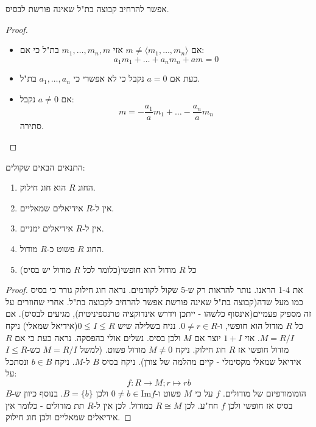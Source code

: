\documentclass{tstextbook}
\begin{document}
\begin{lemma}
אפשר להרחיב קבוצה בת"ל שאינה פורשת לבסיס.

\end{lemma}
\begin{proof}
  \begin{itemize}
    \item אם \(m\neq \langle m_{1},\dots,m_{n} \rangle\) אזי \(m_{1},\dots,m_{n},m\) בת"ל כי אם:
$$a_{1}m_{1}+\dots+a_{n}m_{n}+am=0$$
    \item כעת אם \(a=0\) נקבל כי לא אפשרי כי \(a_{1},\dots,a_{n}\) בת"ל.
    \item אם \(a\neq 0\) נקבל:
$$m=-\frac{a_{1}}{a}m_{1}+\dots-\frac{a_{n}}{a}m_{n}$$
סתירה.
  \end{itemize}
\end{proof}
\begin{proposition}
התנאים הבאים שקולים:

  \begin{enumerate}
    \item החוג \(R\) הוא חוג חילוק. 


    \item אין ל-\(R\) אידיאלים שמאליים. 


    \item אין ל-\(R\) אידיאלים ימניים. 


    \item החוג \(R\) פשוט כ-\(R\) מודול. 


    \item כל \(R\) מודול הוא חופשי(כלומר לכל \(R\) מודול יש בסיס) 


  \end{enumerate}
\end{proposition}
\begin{proof}
את 1-4 הראנו. נותר להראות רק ש-5 שקול לקודמים.
נראה חוג חילוק גורר כי בסיס כמו מעל שדה(קבוצה בת"ל שאינה פורשת אפשר להרחיב לקבוצה בת"ל.
אחרי שחוזרים על זה מספיק פעמיים(אינסוף כלשהו - ייתכן וידרש אינדוקציה טרנספיניטית), מגיעים לבסיס).
אם כל \(R\) מודול הוא חופשי, ו-\(0 \neq r\in R\). 
נניח בשלילה שיש \(0\lneq I\lneq R\)(אידיאל שמאלי) ניקח \(M= R / I\). אזי \(1+I\) יוצר אם \(M\) ולכן בסיס. נשלים אולי בהפסקה.
נראה כעת כי אם \(R\) מודול חופשי אז \(R\) חוג חילוק. ניקח \(M\neq 0\) מודול פשוט. (למשל \(M = R / I\) כש-\(I\leq R\) אידיאל שמאלי מקסימלי - קיים מהלמה של צורן).
ניקח בסיס \(B\) ל-\(M\). ניקח \(b\in B\) ונסתכל על:
$$f:R\to M; r\mapsto rb$$
הומומורפיזם של מודולים. \(f\) על כי \(M\) פשוט ו-\(0\neq b \in \mathrm{Im} f\) ולכן \(B=\{ b \}\). בנוסף כיוון ש-\(B\) בסיס אז חופשי ולכן \(f\) חח"ע. לכן \(R\cong M\) כמודול. לכן אין ל-\(R\) תת מודולים - כלומר אין אידיאלים שמאליים ולכן חוג חילוק.

\end{proof}
\end{document}
